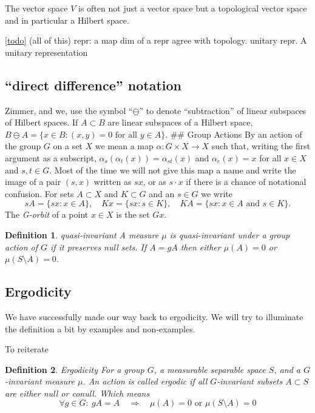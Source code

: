 \documentclass[
]{article}
\newtheorem{defn}{Definition}
\begin{document}
The vector space \(V\) is often not just a vector space but a
topological vector space and in particular a Hilbert space.

\href{ergodicity}{{[}todo{]}} (all of this) repr: a map dim of a repr
agree with topology. unitary repr. A unitary representation

\hypertarget{direct-difference-notation}{%
\subsection{``direct difference''
notation}\label{direct-difference-notation}}

Zimmer, and we, use the symbol ``\(\ominus\)'' to denote ``subtraction''
of linear subspaces of Hilbert spaces. If \(A \subset B\) are linear
subspaces of a Hilbert space,
\(B \ominus A = \{x \in B: (x,y) = 0 \text{ for all }y \in A\}\). \#\#
Group Actions By an action of the group \(G\) on a set \(X\) we mean a
map \(\alpha: G \times X \rightarrow X\) such that, writing the first
argument as a subscript, \(\alpha_s(\alpha_t(x)) = \alpha_{st}(x)\) and
\(\alpha_e(x) = x\) for all \(x \in X\) and \(s, t \in G\). Most of the
time we will not give this map a name and write the image of a pair
\((s, x)\) written as \(sx\), or as \(s \cdot x\) if there is a chance
of notational confusion. For sets \(A \subset X\) and \(K \subset G\)
and an \(s \in G\) we write \[
s A = \{sx : x \in A\},
\quad
K x = \{sx : s \in K \},
\quad
K A = \{sx : x \in A \text{ and } s \in K \}.
\] The \emph{G-orbit} of a point \(x \in X\) is the set \(Gx\).

\begin{defn}{quasi-invariant}
A measure $\mu$ is quasi-invariant under a group action of $G$ if it preserves null sets.
If $A = gA$ then either $\mu(A)=0$ or $\mu(S\setminus A)=0$.
\end{defn}

\hypertarget{ergodicity}{%
\subsection{Ergodicity}\label{ergodicity}}

We have successfully made our way back to ergodicity. We will try to
illuminate the definition a bit by examples and non-examples.

To reiterate

\begin{defn}{Ergodicity}
For a group $G$, a measurable separable space $S$, and a $G$-invariant measure $\mu$. An action is called ergodic if all $G$-invariant subsets $A\subset S$ are either null or conull. Which means 
$$
\forall g\in G:\ gA = A \quad \Rightarrow \quad \mu(A)=0 \text{ or } \mu(S\setminus A)=0
$$
\end{defn}
\end{document}
